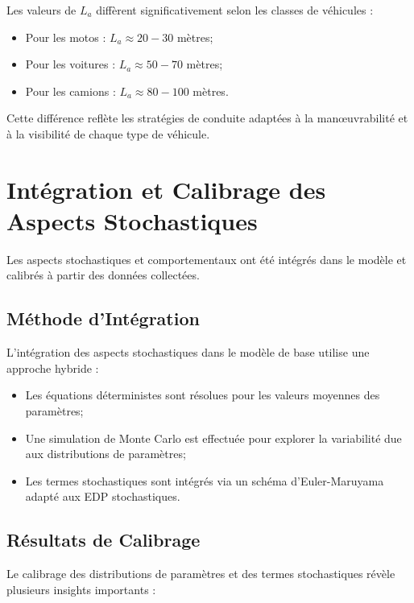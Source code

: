 Les valeurs de $L_a$ diffèrent significativement selon les classes de véhicules :
\begin{itemize}
\item Pour les motos : $L_a \approx 20-30$ mètres;
\item Pour les voitures : $L_a \approx 50-70$ mètres;
\item Pour les camions : $L_a \approx 80-100$ mètres.
\end{itemize}

Cette différence reflète les stratégies de conduite adaptées à la manœuvrabilité et à la visibilité de chaque type de véhicule.

\section{Intégration et Calibrage des Aspects Stochastiques}
\label{sec:integration}

Les aspects stochastiques et comportementaux ont été intégrés dans le modèle et calibrés à partir des données collectées.

\subsection{Méthode d'Intégration}
\label{subsec:methode_integration}

L'intégration des aspects stochastiques dans le modèle de base utilise une approche hybride :

\begin{itemize}
\item Les équations déterministes sont résolues pour les valeurs moyennes des paramètres;
\item Une simulation de Monte Carlo est effectuée pour explorer la variabilité due aux distributions de paramètres;
\item Les termes stochastiques sont intégrés via un schéma d'Euler-Maruyama adapté aux EDP stochastiques.
\end{itemize}

\subsection{Résultats de Calibrage}
\label{subsec:resultats_calibrage}

Le calibrage des distributions de paramètres et des termes stochastiques révèle plusieurs insights importants :

